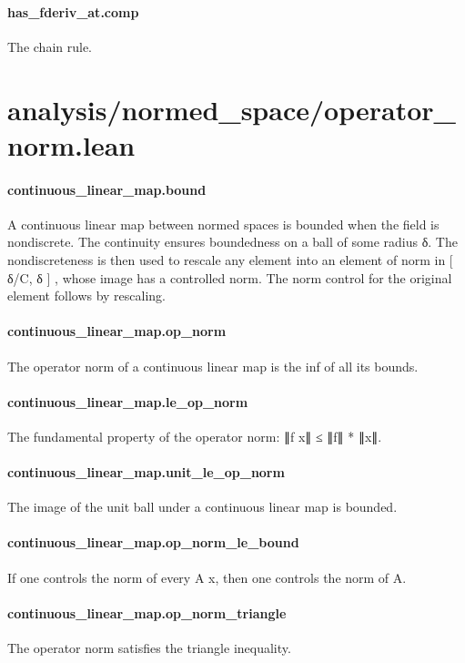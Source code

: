 \documentclass{article}
\begin{document}
\paragraph{has\_fderiv\_at.comp}
\par
The chain rule.
\section{analysis/normed\_space/operator\_norm.lean}\paragraph{continuous\_linear\_map.bound}
\par
A continuous linear map between normed spaces is bounded when the field is nondiscrete.
The continuity ensures boundedness on a ball of some radius δ. The nondiscreteness is then
used to rescale any element into an element of norm in 
{[}
δ/C, δ
{]}
, whose image has a controlled norm.
The norm control for the original element follows by rescaling.
\paragraph{continuous\_linear\_map.op\_norm}
\par
The operator norm of a continuous linear map is the inf of all its bounds.
\paragraph{continuous\_linear\_map.le\_op\_norm}
\par
The fundamental property of the operator norm: ∥f x∥ ≤ ∥f∥ * ∥x∥.
\paragraph{continuous\_linear\_map.unit\_le\_op\_norm}
\par
The image of the unit ball under a continuous linear map is bounded.
\paragraph{continuous\_linear\_map.op\_norm\_le\_bound}
\par
If one controls the norm of every A x, then one controls the norm of A.
\paragraph{continuous\_linear\_map.op\_norm\_triangle}
\par
The operator norm satisfies the triangle inequality.
\end{document}
